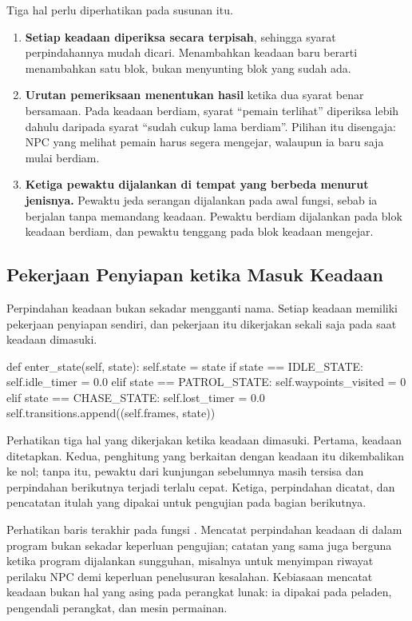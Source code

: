 Tiga hal perlu diperhatikan pada susunan itu.

\begin{enumerate}
  \item \textbf{Setiap keadaan diperiksa secara terpisah}, sehingga syarat
        perpindahannya mudah dicari. Menambahkan keadaan baru berarti
        menambahkan satu blok, bukan menyunting blok yang sudah ada.
  \item \textbf{Urutan pemeriksaan menentukan hasil} ketika dua syarat benar
        bersamaan. Pada keadaan berdiam, syarat ``pemain terlihat'' diperiksa
        lebih dahulu daripada syarat ``sudah cukup lama berdiam''. Pilihan itu
        disengaja: NPC yang melihat pemain harus segera mengejar, walaupun ia
        baru saja mulai berdiam.
  \item \textbf{Ketiga pewaktu dijalankan di tempat yang berbeda menurut
        jenisnya.} Pewaktu jeda serangan dijalankan pada awal fungsi, sebab ia
        berjalan tanpa memandang keadaan. Pewaktu berdiam dijalankan pada blok
        keadaan berdiam, dan pewaktu tenggang pada blok keadaan mengejar.
\end{enumerate}

\subsection{Pekerjaan Penyiapan ketika Masuk Keadaan}

Perpindahan keadaan bukan sekadar mengganti nama. Setiap keadaan memiliki
pekerjaan penyiapan sendiri, dan pekerjaan itu dikerjakan sekali saja pada saat
keadaan dimasuki.

\begin{kodekeluaran}
def enter_state(self, state):
    self.state = state
    if state == IDLE_STATE:
        self.idle_timer = 0.0
    elif state == PATROL_STATE:
        self.waypoints_visited = 0
    elif state == CHASE_STATE:
        self.lost_timer = 0.0
    self.transitions.append((self.frames, state))
\end{kodekeluaran}

Perhatikan tiga hal yang dikerjakan ketika keadaan dimasuki. Pertama, keadaan
ditetapkan. Kedua, penghitung yang berkaitan dengan keadaan itu dikembalikan ke
nol; tanpa itu, pewaktu dari kunjungan sebelumnya masih tersisa dan perpindahan
berikutnya terjadi terlalu cepat. Ketiga, perpindahan dicatat, dan pencatatan
itulah yang dipakai untuk pengujian pada bagian berikutnya.

\begin{catatabox}
Perhatikan baris terakhir pada fungsi . Mencatat perpindahan
keadaan di dalam program bukan sekadar keperluan pengujian; catatan yang sama
juga berguna ketika program dijalankan sungguhan, misalnya untuk menyimpan
riwayat perilaku NPC demi keperluan penelusuran kesalahan. Kebiasaan mencatat
keadaan bukan hal yang asing pada perangkat lunak: ia dipakai pada peladen,
pengendali perangkat, dan mesin permainan.
\end{catatabox}

